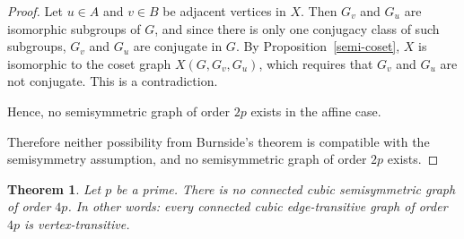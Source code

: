 \documentclass[12pt,a4paper,openany]{book}
\newtheorem{theorem}{Theorem}[section]
\begin{document}
\begin{proof}
Let $u \in A$ and $v \in B$ be adjacent vertices in $X$. Then $G_v$ and $G_u$ are isomorphic subgroups of $G$, and since there is only one conjugacy class of such subgroups, $G_v$ and $G_u$ are conjugate in $G$. By Proposition~\ref{semi-coset}, $X$ is isomorphic to the coset graph $X(G, G_v, G_u)$, which requires that $G_v$ and $G_u$ are not conjugate. This is a contradiction.  

Hence, no semisymmetric graph of order $2p$ exists in the affine case.

\medskip
Therefore neither possibility from Burnside's theorem is compatible with the semisymmetry assumption, and no semisymmetric graph of order $2p$ exists.

\end{proof}

\begin{theorem}
Let $p$ be a prime.  There is no connected cubic semisymmetric graph of order $4p$.
In other words: every connected cubic edge-transitive graph of order $4p$ is
vertex-transitive.
\end{theorem}
\end{document}

